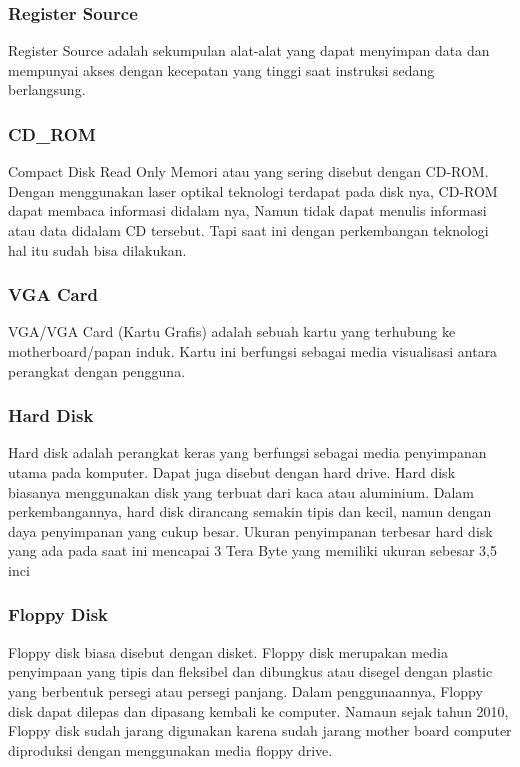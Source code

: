  			\subsubsection{Register Source}
 		Register Source adalah sekumpulan alat-alat yang dapat menyimpan data dan mempunyai akses dengan kecepatan yang tinggi saat instruksi sedang berlangsung.


 			\subsubsection{CD_ROM}
 		Compact Disk Read Only Memori atau yang sering disebut dengan CD-ROM. Dengan menggunakan laser optikal teknologi terdapat pada disk nya, CD-ROM dapat membaca informasi didalam nya, Namun
 		tidak dapat menulis informasi atau data didalam CD tersebut. Tapi saat ini dengan perkembangan teknologi hal itu sudah bisa dilakukan.
 			\subsubsection{VGA Card}
 		VGA/VGA Card (Kartu Grafis) adalah sebuah kartu yang terhubung ke motherboard/papan induk. Kartu ini berfungsi sebagai media visualisasi antara perangkat dengan pengguna.


 			\subsubsection{Hard Disk}
 		Hard disk adalah perangkat keras yang berfungsi sebagai media penyimpanan utama pada komputer. Dapat juga disebut dengan hard drive. Hard disk biasanya menggunakan disk yang  terbuat dari kaca atau aluminium. Dalam perkembangannya, hard disk dirancang semakin tipis dan kecil, namun dengan daya penyimpanan yang cukup besar. Ukuran penyimpanan terbesar hard disk yang ada pada saat ini mencapai 3 Tera Byte yang memiliki ukuran sebesar 3,5 inci
 			\subsubsection{Floppy Disk}
 		Floppy disk biasa disebut dengan disket. Floppy disk merupakan media penyimpaan yang tipis dan fleksibel dan dibungkus atau disegel dengan plastic yang berbentuk persegi atau persegi panjang. Dalam penggunaannya, Floppy disk dapat dilepas dan dipasang kembali ke computer. Namaun sejak tahun 2010, Floppy disk sudah jarang digunakan karena sudah jarang mother board computer diproduksi dengan menggunakan media floppy drive.



